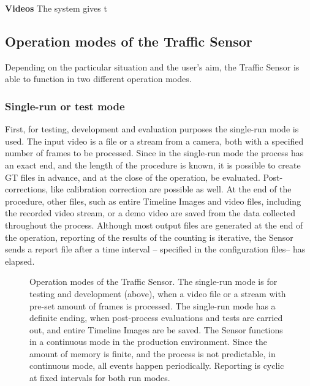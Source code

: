 \textbf{Videos}
The system gives t
\subsection{Operation modes of the Traffic Sensor}
Depending on the particular situation and the user's aim, the Traffic Sensor is able to function in two different operation modes.
\subsubsection{Single-run or test mode}\label{sec:run_modes}
First, for testing, development and evaluation purposes the single-run mode is used.
The input video is a file or a stream from a camera, both with a specified number of frames to be processed.
Since in the single-run mode the process has an exact end, and the length of the procedure is known, it is possible to create GT files in advance, and at the close of the operation, be evaluated.
Post-corrections, like calibration correction are possible as well.
At the end of the procedure, other files, such as entire Timeline Images and video files, including the recorded video stream, or a demo video are saved from the data collected throughout the process.
Although most output files are generated at the end of the operation, reporting of the results of the counting is iterative, the Sensor sends a report file after a time interval -- specified in the configuration files-- has elapsed.

\begin{figure}[!h]
	\centering
	
	\caption{Operation modes of the Traffic Sensor. The single-run mode is for testing and development (above), when a video file or a stream with pre-set amount of frames is processed. The single-run mode has a definite ending, when post-process evaluations and tests are carried out, and entire Timeline Images are be saved. The Sensor functions in a continuous mode in the production environment. Since the amount of memory is finite, and the process is not predictable, in continuous mode, all events happen periodically. Reporting is cyclic at fixed intervals for both run modes. \label{fig:run_types}}
\end{figure}

